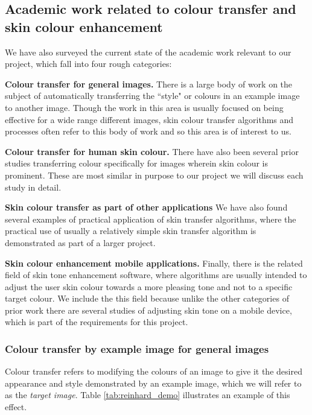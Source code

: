 

\subsection{Academic work related to colour transfer and skin colour enhancement \label{sec:academic_work}}

We have also surveyed the current state of the academic work relevant to our project, which fall into four rough categories:

\textbf{Colour transfer for general images.} There is a large body of work on the subject of automatically transferring the ``style" or colours in an example image to another image. Though the work in this area is usually focused on being effective for a wide range different images, skin colour transfer algorithms and processes often refer to this body of work and so this area is of interest to us.

\textbf{Colour transfer for human skin colour.} There have also been several prior studies transferring colour specifically for images wherein skin colour is prominent. These are most similar in purpose to our project we will discuss each study in detail.

\textbf{Skin colour transfer as part of other applications} We have also found several examples of practical application of skin transfer algorithms, where the practical use of usually a relatively simple skin transfer algorithm is demonstrated as part of a larger project. 

\textbf{Skin colour enhancement mobile applications.} Finally, there is the related field of skin tone enhancement software, where algorithms are usually intended to adjust the user skin colour towards a more pleasing tone and not to a specific target colour. We include the this field because unlike the other categories of prior work there are several studies of adjusting skin tone on a mobile device, which is part of the requirements for this project.

\subsubsection{Colour transfer by example image for general images}
Colour transfer refers to modifying the colours of an image to give it the desired appearance and style demonstrated by an example image, which we will refer to as the \textit{target image}. Table \ref{tab:reinhard_demo} illustrates an example of this effect.

